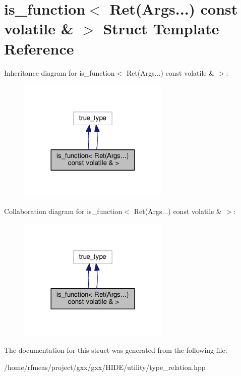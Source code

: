 \hypertarget{structis__function_3_01Ret_07Args_8_8_8_08_01const_01volatile_01_6_01_4}{}\section{is\+\_\+function$<$ Ret(Args...) const volatile \& $>$ Struct Template Reference}
\label{structis__function_3_01Ret_07Args_8_8_8_08_01const_01volatile_01_6_01_4}


Inheritance diagram for is\+\_\+function$<$ Ret(Args...) const volatile \& $>$\+:
\nopagebreak
\begin{figure}[H]
\begin{center}
\leavevmode
\includegraphics[width=204pt]{structis__function_3_01Ret_07Args_8_8_8_08_01const_01volatile_01_6_01_4__inherit__graph}
\end{center}
\end{figure}


Collaboration diagram for is\+\_\+function$<$ Ret(Args...) const volatile \& $>$\+:
\nopagebreak
\begin{figure}[H]
\begin{center}
\leavevmode
\includegraphics[width=204pt]{structis__function_3_01Ret_07Args_8_8_8_08_01const_01volatile_01_6_01_4__coll__graph}
\end{center}
\end{figure}


The documentation for this struct was generated from the following file\+:\begin{DoxyCompactItemize}
\item 
/home/rfmeas/project/gxx/gxx/\+H\+I\+D\+E/utility/type\+\_\+relation.\+hpp\end{DoxyCompactItemize}
